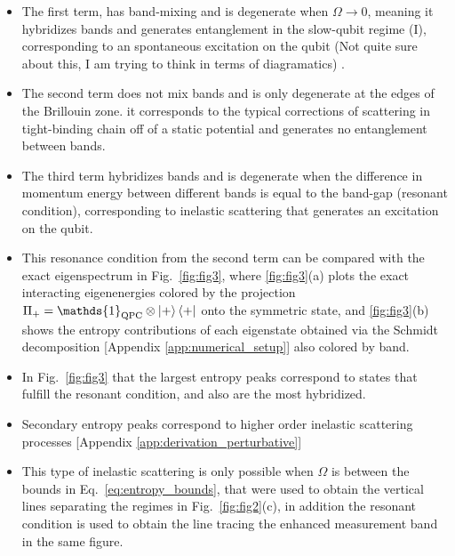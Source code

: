 \documentclass[10pt,
 amsmath,amssymb,
 aps,prb, twocolumn
]{revtex4-2}
\newcommand{\id}{\mathds{1}}
\newcommand\sj[1]{ {\color{cyan} #1} }
\begin{document}
\begin{itemize}
    \item The first term, has band-mixing and is degenerate when \mbox{$\Omega \rightarrow 0$}, meaning it hybridizes bands and generates entanglement in the slow-qubit regime (I), corresponding to an spontaneous excitation on the qubit \sj{(Not quite sure about this, I am trying to think in terms of diagramatics)}. 

    \item The second term does not mix bands and is only degenerate at the edges of the Brillouin zone. it corresponds to the typical corrections of scattering in tight-binding chain off of a static potential and generates no entanglement between bands.

    \item The third term hybridizes bands and is degenerate when the difference in momentum energy between different bands is equal to the band-gap (resonant condition), corresponding to inelastic scattering that generates an excitation on the qubit.

    \item This resonance condition from the second term can be compared with the exact eigenspectrum in Fig.~\ref{fig:fig3}, where \ref{fig:fig3}(a) plots the exact interacting eigenenergies colored by the projection \mbox{$\Pi_+ = \id_{\text{QPC}}\otimes\ket{+}\bra{+}$} onto the symmetric state, and \ref{fig:fig3}(b) shows the entropy contributions of each eigenstate obtained via the Schmidt decomposition [Appendix \ref{app:numerical_setup}] also colored by band.

    \item In Fig.~\ref{fig:fig3} that the largest entropy peaks correspond to states that fulfill the resonant condition, and also are the most hybridized.

    \item \sj{Secondary entropy peaks correspond to higher order inelastic scattering processes [Appendix \ref{app:derivation_perturbative}]}

     \item This type of inelastic scattering is only possible when $\Omega$  is between the bounds in Eq.~\eqref{eq:entropy_bounds}, that were used to obtain the vertical lines separating the regimes in Fig.~\ref{fig:fig2}(c), in addition the resonant condition is used to obtain the line tracing the enhanced measurement band in the same figure.

\end{itemize}
 
\end{document}
